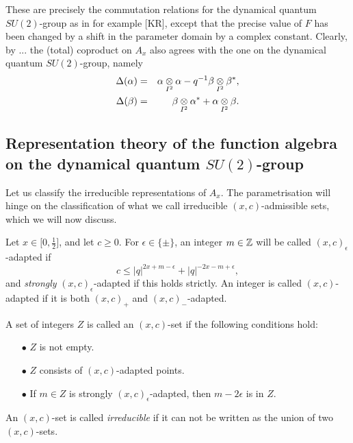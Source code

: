These are precisely the commutation relations for the dynamical quantum $SU(2)$-group as in for example [KR], except that the precise value of $F$ has been changed by a shift in the parameter domain by a complex constant. Clearly, by ... the (total) coproduct on $A_x$ also  agrees with the one on the dynamical quantum $SU(2)$-group, namely \begin{eqnarray*} \Delta(\alpha) &=& \alpha\underset{I^2}{\otimes} \alpha - q^{-1}\beta\underset{I^2}{\otimes} \beta^*,\\ \Delta(\beta) &=& \beta\underset{I^2}{\otimes} \alpha^* +\alpha\underset{I^2}{\otimes} \beta.\end{eqnarray*}%

\subsection{Representation theory of the function algebra on the dynamical quantum $SU(2)$-group}


Let us classify the irreducible representations of $A_x$. The parametrisation will hinge on the classification of what we call irreducible $(x,c)$-admissible sets, which we will now discuss.

Let $x\in \lbrack 0,\frac{1}{2}\rbrack$, and let $c\geq 0$. For $\epsilon \in \{\pm\}$, an integer $m\in \mathbb{Z}$ will be called $(x,c)_{\epsilon}$-adapted if \begin{equation}\label{EqAd+}c \leq |q|^{2x+m-\epsilon}+|q|^{-2x-m+\epsilon},\end{equation} and \emph{strongly} $(x,c)_{\epsilon}$-adapted if this holds strictly. An integer is called $(x,c)$-adapted if it is both $(x,c)_+$ and $(x,c)_-$-adapted. 

A set of integers $Z$ is called an  $(x,c)$-set if the following conditions hold: \begin{itemize} 
\item[$\bullet$] $Z$ is not empty.
\item[$\bullet$] $Z$ consists of $(x,c)$-adapted points.
\item[$\bullet$] If $m\in Z$ is strongly $(x,c)_{\epsilon}$-adapted, then $m-2\epsilon$ is in $Z$.
\end{itemize}
An $(x,c)$-set is called \emph{irreducible} if it can not be written as the union of two $(x,c)$-sets.

